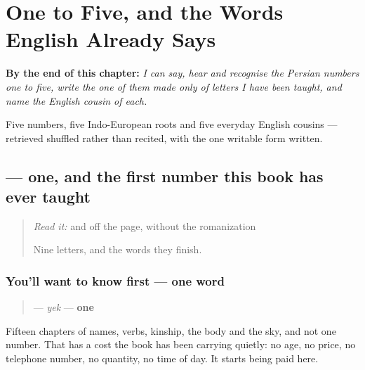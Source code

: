 
\chapter{One to Five, and the Words English Already Says}
\label{ch:fa-count-five}

\begin{chapteropening}
\textbf{By the end of this chapter:} \emph{I can say, hear and recognise the Persian numbers one to five, write the one of them made only of letters I have been taught, and name the English cousin of each.}

Five numbers, five Indo-European roots and five everyday English cousins — retrieved shuffled rather than recited, with the one writable form written.
\end{chapteropening}

\section[\texorpdfstring{\fa{یک} (yek)}{یک (yek)}]{ — one, and the first number this book has ever taught}

\label{lesson:FA-C16-yek}



\begin{quote}
\emph{Read it:} \textbf{} and \textbf{} off the page, without the romanization

Nine letters, and the words they finish.
\end{quote}

\subsection*{You'll want to know first — one word}
\begin{quote}
\textbf{} — \emph{yek} — \textbf{one}
\end{quote}

Fifteen chapters of names, verbs, kinship, the body and the sky, and not one number. That has a cost the book has been carrying quietly: no age, no price, no telephone number, no quantity, no time of day. It starts being paid here.

